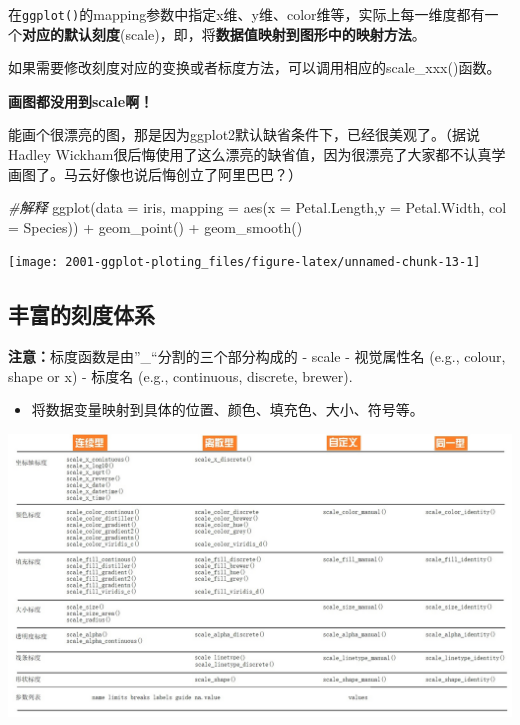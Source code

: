 \documentclass[
]{book}
\newenvironment{Shaded}{\begin{snugshade}}{\end{snugshade}}
\newcommand{\AttributeTok}[1]{\textcolor[rgb]{0.77,0.63,0.00}{#1}}
\newcommand{\CommentTok}[1]{\textcolor[rgb]{0.56,0.35,0.01}{\textit{#1}}}
\newcommand{\FunctionTok}[1]{\textcolor[rgb]{0.00,0.00,0.00}{#1}}
\newcommand{\NormalTok}[1]{#1}
\newcommand{\SpecialCharTok}[1]{\textcolor[rgb]{0.00,0.00,0.00}{#1}}
\providecommand{\tightlist}{%
  \setlength{\itemsep}{0pt}\setlength{\parskip}{0pt}}
\begin{document}
在\texttt{ggplot()}的mapping参数中指定x维、y维、color维等，实际上每一维度都有一个\textbf{对应的默认刻度}(scale)，即，将\textbf{数据值映射到图形中的映射方法}。

如果需要修改刻度对应的变换或者标度方法，可以调用相应的scale\_xxx()函数。

\textbf{画图都没用到scale啊！}

能画个很漂亮的图，那是因为ggplot2默认缺省条件下，已经很美观了。（据说Hadley
Wickham很后悔使用了这么漂亮的缺省值，因为很漂亮了大家都不认真学画图了。马云好像也说后悔创立了阿里巴巴？）

\begin{Shaded}
\begin{Highlighting}[]
\CommentTok{\#解释}
\FunctionTok{ggplot}\NormalTok{(}\AttributeTok{data =}\NormalTok{ iris, }\AttributeTok{mapping =} \FunctionTok{aes}\NormalTok{(}\AttributeTok{x =}\NormalTok{ Petal.Length,}\AttributeTok{y =}\NormalTok{ Petal.Width, }\AttributeTok{col =}\NormalTok{ Species)) }\SpecialCharTok{+}
  \FunctionTok{geom\_point}\NormalTok{() }\SpecialCharTok{+} 
  \FunctionTok{geom\_smooth}\NormalTok{() }
\end{Highlighting}
\end{Shaded}

\begin{center}\texttt{[image: 2001-ggplot-ploting\_files/figure-latex/unnamed-chunk-13-1]} \end{center}

\hypertarget{ux4e30ux5bccux7684ux523bux5ea6ux4f53ux7cfb}{%
\subsection{丰富的刻度体系}\label{ux4e30ux5bccux7684ux523bux5ea6ux4f53ux7cfb}}

\textbf{注意：}标度函数是由''\_``分割的三个部分构成的 - scale - 视觉属性名
(e.g., colour, shape or x) - 标度名 (e.g., continuous, discrete,
brewer).

\begin{itemize}
\tightlist
\item
  将数据变量映射到具体的位置、颜色、填充色、大小、符号等。
\end{itemize}

\includegraphics{figure/23.jpg}
\end{document}
